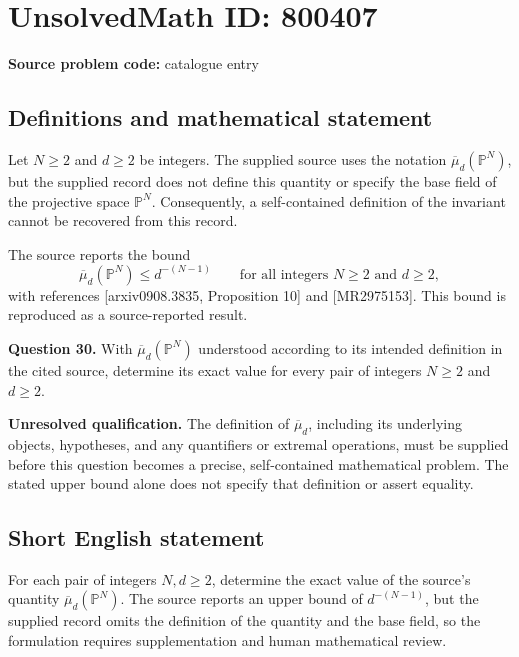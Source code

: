 \documentclass[11pt]{article}
\begin{document}
\section*{UnsolvedMath ID: 800407}
\textbf{Source problem code:} catalogue entry
\subsection{Definitions and mathematical statement}
Let \(N\ge 2\) and \(d\ge 2\) be integers. The supplied source uses the notation \(\overline{\mu}_d(\mathbb{P}^N)\), but the supplied record does not define this quantity or specify the base field of the projective space \(\mathbb{P}^N\). Consequently, a self-contained definition of the invariant cannot be recovered from this record.

The source reports the bound
\[
\overline{\mu}_d(\mathbb{P}^N)\le d^{-(N-1)}
\qquad\text{for all integers }N\ge 2\text{ and }d\ge 2,
\]
with references [arxiv0908.3835, Proposition 10] and [MR2975153]. This bound is reproduced as a source-reported result.

\textbf{Question 30.} With \(\overline{\mu}_d(\mathbb{P}^N)\) understood according to its intended definition in the cited source, determine its exact value for every pair of integers \(N\ge 2\) and \(d\ge 2\).

\textbf{Unresolved qualification.} The definition of \(\overline{\mu}_d\), including its underlying objects, hypotheses, and any quantifiers or extremal operations, must be supplied before this question becomes a precise, self-contained mathematical problem. The stated upper bound alone does not specify that definition or assert equality.
\subsection{Short English statement}
For each pair of integers \(N,d\ge 2\), determine the exact value of the source's quantity \(\overline{\mu}_d(\mathbb{P}^N)\). The source reports an upper bound of \(d^{-(N-1)}\), but the supplied record omits the definition of the quantity and the base field, so the formulation requires supplementation and human mathematical review.
\end{document}
